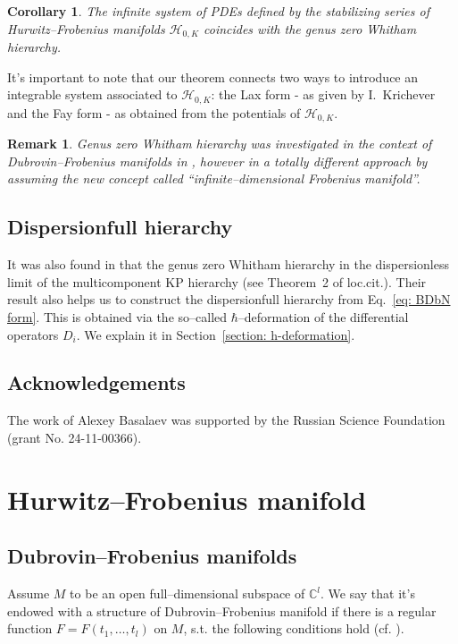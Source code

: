 \documentclass[12pt,a4paper]{amsart}
\newcommand{\CC}{{\mathbb{C}}}
\def\H{{\mathcal H}}
\newcommand{\<}{\left<}
\renewcommand{\>}{\right>}
\newtheorem*{corollary*}{Corollary}
\newtheorem{remark}[theorem]{Remark}
\numberwithin{equation}{section}
\begin{document}
\begin{corollary*}
    The infinite system of PDEs defined by the stabilizing series of Hurwitz--Frobenius manifolds $\H_{0,K}$ coincides with the genus zero Whitham hierarchy.
\end{corollary*}

It's important to note that our theorem connects two ways to introduce an integrable system associated to $\H_{0,K}$: the Lax form - as given by I.~Krichever and the Fay form - as obtained from the potentials of $\H_{0,K}$.

\begin{remark}
Genus zero Whitham hierarchy was investigated in the context of Dubrovin--Frobenius manifolds in \cite{Sh24,SWZ}, however in a totally different approach by assuming the new concept called ``infinite--dimensional Frobenius manifold''. 
\end{remark}

\subsection*{Dispersionfull hierarchy}
It was also found in \cite{TT07} that the genus zero Whitham hierarchy in the dispersionless limit of the multicomponent KP hierarchy (see Theorem~2 of loc.cit.). Their result also helps us to construct the dispersionfull hierarchy from Eq.~\eqref{eq: BDbN form}. This is obtained via the so--called $\hbar$--deformation of the differential operators $D_i$. We explain it in Section~\ref{section: h-deformation}.

\subsection{Acknowledgements}
The work of Alexey Basalaev was supported by the Russian Science Foundation (grant No. 24-11-00366).


\section{Hurwitz--Frobenius manifold}


\subsection{Dubrovin--Frobenius manifolds}
Assume $M$ to be an open full--dimensional subspace of $\CC^l$. We say that it's endowed with a structure of Dubrovin--Frobenius manifold if there is a regular function $F = F(t_1,\dots,t_l)$ on $M$, s.t. the following conditions hold (cf. \cite{D2}).
\end{document}
